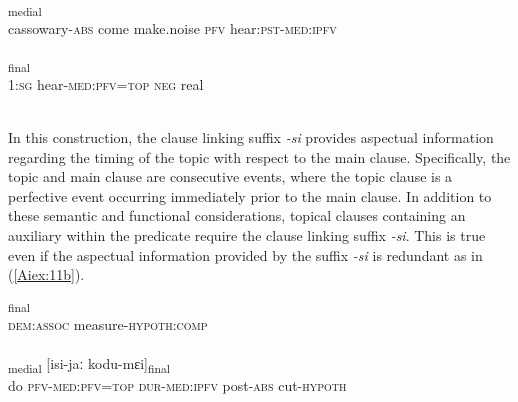 \documentclass[output=paper]{LSP/langsci}
\begin{document}
\begin{exe}
\ex \label{Aiex:10ab}
\begin{xlist}
\ex \label{Aiex:10a}
\textsubscript{medial}\\
cassowary-\textsc{abs}	come	make.noise	\textsc{pfv}	hear:\textsc{pst}-\textsc{med}:\textsc{ipfv}\\
\glt {}\\
\ex \label{Aiex:10b}
\textsubscript{final}\\
1:\textsc{sg}	hear-\textsc{med}:\textsc{pfv}=\textsc{top}	\textsc{neg}	real\\
\glt {}\\
\end{xlist}
\end{exe}

In this construction, the clause linking suffix \textit{-si} provides aspectual information regarding the timing of the topic with respect to the main clause. Specifically, the topic and main clause are consecutive events, where the topic clause is a perfective event occurring immediately prior to the main clause.
	In addition to these semantic and functional considerations, topical clauses containing an auxiliary within the predicate require the clause linking suffix  \textit{-si}. This is true even if the aspectual information provided by the suffix  \textit{-si} is redundant as in (\ref{Aiex:11b}).

\begin{exe}
\ex \label{Aiex:11ab}
\begin{xlist}
\ex \label{Aiex:11a}
\textsubscript{final}\\
\textsc{dem}:\textsc{assoc}	measure-\textsc{hypoth}:\textsc{comp}\\
\glt {}\\
\ex \label{Aiex:11b}
\textsubscript{medial}	[isi-jaː	kodu-mɛi]\textsubscript{final}\\
do	\textsc{pfv}-\textsc{med}:\textsc{pfv}=\textsc{top}	\textsc{dur}-\textsc{med}:\textsc{ipfv}	post-\textsc{abs}	cut-\textsc{hypoth}\\
\glt {}\\
\end{xlist}
\end{exe}
\end{document}
